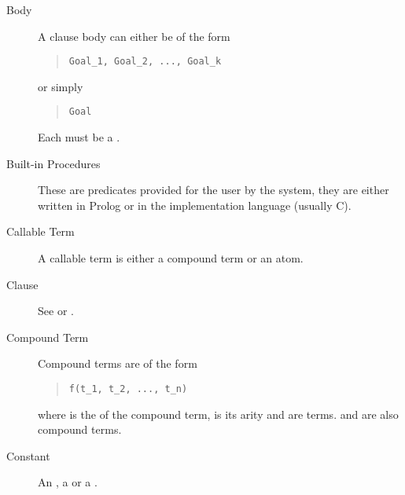 \begin{description}
\item[Body]
A clause body can either be of the form
\begin{quote}
\begin{verbatim}
Goal_1, Goal_2, ..., Goal_k
\end{verbatim}
\end{quote}
or simply
\begin{quote}
\begin{verbatim}
Goal
\end{verbatim}
\end{quote}
Each  must be a .

\item[Built-in Procedures]
These are predicates provided for the user by the
{\eclipse} system, they are either written in Prolog or in the implementation
language (usually C).

\item[Callable Term]
A callable term is either a compound term or an atom.

\item[Clause]
See  or .

\item[Compound Term]
Compound terms are of the form
\begin{quote}
\begin{verbatim}
f(t_1, t_2, ..., t_n)
\end{verbatim}
\end{quote}
where  is the  of the compound term,  is its
arity and  are terms.
 and  are also compound terms.

\item[Constant]
An , a  or a .


\end{description}
